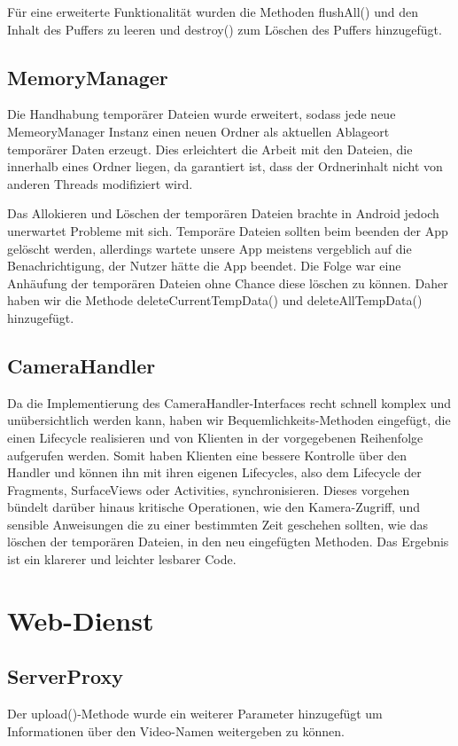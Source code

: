 Für eine erweiterte Funktionalität wurden die Methoden flushAll() und den Inhalt des Puffers zu leeren und destroy() zum Löschen des Puffers hinzugefügt.

\subsection{MemoryManager} \label{MemoryManager}
Die Handhabung temporärer Dateien wurde erweitert, sodass jede neue MemeoryManager Instanz einen neuen Ordner als aktuellen Ablageort temporärer Daten erzeugt. Dies erleichtert die Arbeit mit den Dateien, die innerhalb eines Ordner liegen, da garantiert ist, dass der Ordnerinhalt nicht von anderen Threads modifiziert wird. \par
Das Allokieren und Löschen der temporären Dateien brachte in Android jedoch unerwartet Probleme mit sich. Temporäre Dateien sollten beim beenden der App gelöscht werden, allerdings wartete unsere App meistens vergeblich auf die Benachrichtigung, der Nutzer hätte die App beendet. Die Folge war eine Anhäufung der temporären Dateien ohne Chance diese löschen zu können. Daher haben wir die Methode deleteCurrentTempData() und deleteAllTempData() hinzugefügt. \par

\subsection{CameraHandler} \label{CameraHandler}
Da die Implementierung des CameraHandler-Interfaces recht schnell komplex und unübersichtlich werden kann, haben wir Bequemlichkeits-Methoden eingefügt, die einen Lifecycle realisieren und von Klienten in der vorgegebenen Reihenfolge aufgerufen werden. Somit haben Klienten eine bessere Kontrolle über den Handler und können ihn mit ihren eigenen Lifecycles, also dem Lifecycle der Fragments, SurfaceViews oder Activities, synchronisieren. Dieses vorgehen bündelt darüber hinaus kritische Operationen, wie den Kamera-Zugriff, und sensible Anweisungen die zu einer bestimmten Zeit geschehen sollten, wie das löschen der temporären Dateien, in den neu eingefügten Methoden. Das Ergebnis ist ein klarerer und leichter lesbarer Code.

\section{Web-Dienst}

\subsection{ServerProxy}
Der upload()-Methode wurde ein weiterer Parameter hinzugefügt um Informationen über den Video-Namen weitergeben zu können.  \par  

